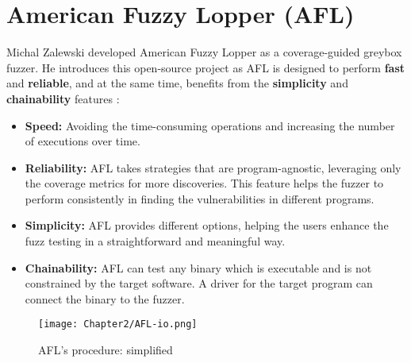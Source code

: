 \section{American Fuzzy Lopper (AFL)} 
\label{sec:2-afl}

Michal Zalewski developed American Fuzzy Lopper as a coverage-guided greybox fuzzer. He introduces this open-source project as  \cite{zalewski2014american} AFL is designed to perform \textbf{fast} and \textbf{reliable}, and at the same time, benefits from the \textbf{simplicity} and \textbf{chainability} features \cite{about_afl}:

\begin{itemize}
    \item \textbf{Speed:} Avoiding the time-consuming operations and increasing the number of executions over time.
    \item \textbf{Reliability:} AFL takes strategies that are program-agnostic, leveraging only the coverage metrics for more discoveries. This feature helps the fuzzer to perform consistently in finding the vulnerabilities in different programs.
    \item \textbf{Simplicity:} AFL provides different options, helping the users enhance the fuzz testing in a straightforward and meaningful way. 
    \item \textbf{Chainability:} AFL can test any binary which is executable and is not constrained by the target software. A driver for the target program can connect the binary to the fuzzer. 
\end{itemize}

\begin{figure}[!b]
    \texttt{[image: Chapter2/AFL-io.png]}
    \centering
    \captionsetup{justification=centering}
    \caption{AFL's procedure: simplified}
    \label{fig:afl-io}
\end{figure}

